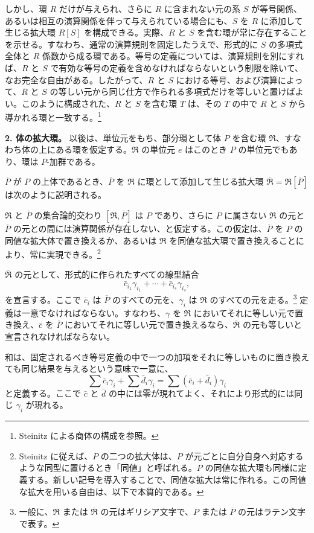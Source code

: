 \documentclass[11pt]{article}
\begin{document}
しかし、環 $R$ だけが与えられ、さらに $R$ に含まれない元の系 $S$ が等号関係、あるいは相互の演算関係を伴って与えられている場合にも、$S$ を $R$ に添加して生じる拡大環 $R[S]$ を構成できる。実際、$R$ と $S$ を含む環が常に存在することを示せる。すなわち、通常の演算規則を固定したうえで、形式的に $S$ の多項式全体と $R$ 係数から成る環である。等号の定義については、演算規則を別にすれば、$R$ と $S$ で有効な等号の定義を含めなければならないという制限を除いて、なお完全な自由がある。したがって、$R$ と $S$ における等号、および演算によって、$R$ と $S$ の等しい元から同じ仕方で作られる多項式だけを等しいと置けばよい。このように構成された、$R$ と $S$ を含む環 $T$ は、その $T$ の中で $R$ と $S$ から導かれる環と一致する。\footnote{Steinitz による商体の構成を参照。}

\textbf{2. 体の拡大環。} 以後は、単位元をもち、部分環として体 $P$ を含む環 $\mathfrak R$、すなわち体の上にある環を仮定する。$\mathfrak R$ の単位元 $e$ はこのとき $P$ の単位元でもあり、環は $P$-加群である。

$\overline P$ が $P$ の上体であるとき、$\overline P$ を $\mathfrak R$ に環として添加して生じる拡大環 $\overline{\mathfrak R}=\mathfrak R[\overline P]$ は次のように説明される。

$\mathfrak R$ と $\overline P$ の集合論的交わり $[\mathfrak R,\overline P]$ は $P$ であり、さらに $P$ に属さない $\mathfrak R$ の元と $\overline P$ の元との間には演算関係が存在しない、と仮定する。この仮定は、$\overline P$ を $P$ の同値な拡大体で置き換えるか、あるいは $\mathfrak R$ を同値な拡大環で置き換えることにより、常に実現できる。\footnote{Steinitz に従えば、$P$ の二つの拡大体は、$P$ が元ごとに自分自身へ対応するような同型に置けるとき「同値」と呼ばれる。$P$ の同値な拡大環も同様に定義する。新しい記号を導入することで、同値な拡大は常に作れる。この同値な拡大を用いる自由は、以下で本質的である。}

$\overline{\mathfrak R}$ の元として、形式的に作られたすべての線型結合
\[
   \bar c_{i_1}\gamma_{i_1}+\cdots+\bar c_{i_s}\gamma_{i_s},
\]
を宣言する。ここで $\bar c_i$ は $\overline P$ のすべての元を、$\gamma_i$ は $\mathfrak R$ のすべての元を走る。\footnote{一般に、$\mathfrak R$ または $\overline{\mathfrak R}$ の元はギリシア文字で、$P$ または $\overline P$ の元はラテン文字で表す。} 定義は一意でなければならない。すなわち、$\gamma$ を $\mathfrak R$ においてそれに等しい元で置き換え、$\bar c$ を $\overline P$ においてそれに等しい元で置き換えるなら、$\overline{\mathfrak R}$ の元も等しいと宣言されなければならない。

和は、固定されるべき等号定義の中で一つの加項をそれに等しいものに置き換えても同じ結果を与えるという意味で一意に、
\[
  \sum \bar c_i\gamma_i+\sum \bar d_i\gamma_i
  =\sum(\bar c_i+\bar d_i)\gamma_i
\]
と定義する。ここで $\bar c$ と $\bar d$ の中には零が現れてよく、それにより形式的には同じ $\gamma_i$ が現れる。
\end{document}

